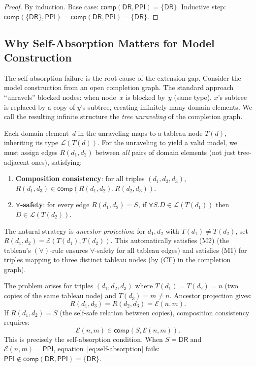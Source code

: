 \documentclass[a4paper,11pt]{article}
\theoremstyle{definition}
\newcommand{\DR}{\ensuremath{\mathsf{DR}}}
\newcommand{\PPI}{\ensuremath{\mathsf{PPI}}}
\newcommand{\comp}{\ensuremath{\mathsf{comp}}}
\begin{document}
\begin{proof}
By induction.  Base case: $\comp(\DR, \PPI) = \{\DR\}$.  Inductive
step: $\comp(\{\DR\}, \PPI) = \comp(\DR, \PPI) = \{\DR\}$.
\end{proof}

\subsection{Why Self-Absorption Matters for Model Construction}

The self-absorption failure is the root cause of the extension gap.
Consider the model construction from an open completion graph.  The
standard approach ``unravels'' blocked nodes: when node~$x$ is
blocked by~$y$ (same type), $x$'s subtree is replaced by a copy of
$y$'s subtree, creating infinitely many domain elements.  We call the
resulting infinite structure the \emph{tree unraveling} of the
completion graph.

Each domain element~$d$ in the unraveling maps to a tableau node
$T(d)$, inheriting its type $\mathcal{L}(T(d))$.  For the unraveling
to yield a valid model, we must assign edges $R(d_1, d_2)$ between
\emph{all} pairs of domain elements (not just tree-adjacent ones),
satisfying:
\begin{enumerate}[nosep,label=(M\arabic*)]
  \item \textbf{Composition consistency}: for all triples $(d_1, d_2,
    d_3)$, $R(d_1, d_3) \in \comp(R(d_1, d_2), R(d_2, d_3))$.
  \item \textbf{$\forall$-safety}: for every edge $R(d_1, d_2) = S$,
    if $\forall S.D \in \mathcal{L}(T(d_1))$ then $D \in
    \mathcal{L}(T(d_2))$.
\end{enumerate}

The natural strategy is \emph{ancestor projection}: for $d_1, d_2$
with $T(d_1) \neq T(d_2)$, set $R(d_1, d_2) = \mathcal{E}(T(d_1),
T(d_2))$.  This automatically satisfies (M2) (the tableau's
$(\forall)$-rule ensures $\forall$-safety for all tableau edges) and
satisfies (M1) for triples mapping to three distinct tableau nodes
(by (CF) in the completion graph).

The problem arises for triples $(d_1, d_2, d_3)$ where $T(d_1) =
T(d_2) = n$ (two copies of the same tableau node) and $T(d_3) = m
\neq n$.  Ancestor projection gives:
\[
  R(d_1, d_3) = R(d_2, d_3) = \mathcal{E}(n, m).
\]
If $R(d_1, d_2) = S$ (the self-safe relation between copies),
composition consistency requires:
\begin{equation}
\label{eq:self-absorption}
  \mathcal{E}(n, m) \in \comp(S, \mathcal{E}(n, m)).
\end{equation}
This is precisely the self-absorption condition.  When $S = \DR$ and
$\mathcal{E}(n, m) = \PPI$, equation~\eqref{eq:self-absorption}
fails: $\PPI \notin \comp(\DR, \PPI) = \{\DR\}$.
\end{document}
